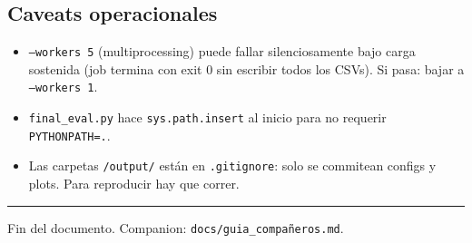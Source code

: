 \documentclass[11pt,a4paper]{article}
\newcommand{\code}[1]{\texttt{\textcolor{accent}{#1}}}
\newcommand{\file}[1]{\texttt{\small #1}}
\begin{document}
\subsection{Caveats operacionales}
\begin{itemize}[leftmargin=1.4em, itemsep=2pt]
  \item \texttt{--workers 5} (multiprocessing) puede fallar silenciosamente bajo carga sostenida (job termina con exit 0 sin escribir todos los CSVs). Si pasa: bajar a \texttt{--workers 1}.
  \item \file{final\_eval.py} hace \texttt{sys.path.insert} al inicio para no requerir \texttt{PYTHONPATH=.}.
  \item Las carpetas \file{*/output/} están en \file{.gitignore}: solo se commitean configs y plots. Para reproducir hay que correr.
\end{itemize}

\bigskip
\noindent\rule{\linewidth}{0.4pt}\par
\smallskip
\noindent\textcolor{muted}{\small Fin del documento. Companion: \code{docs/guia\_compañeros.md}.}
\end{document}
